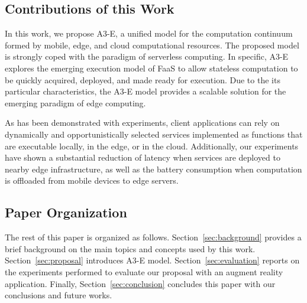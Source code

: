 \subsection{Contributions of this Work}

In this work, we propose A3-E, a unified model for the computation continuum formed by mobile, edge, and cloud computational resources. The proposed model is strongly coped with the paradigm of serverless computing. In specific, A3-E explores the emerging execution model of FaaS to allow stateless computation to be quickly acquired, deployed, and made ready for execution. Due to the its particular characteristics, the A3-E model provides a scalable solution for the emerging paradigm of edge computing. 

As has been demonstrated with experiments, client applications can rely on dynamically and opportunistically selected services implemented as functions that are executable locally, in the edge, or in the cloud. Additionally, our experiments have shown a substantial reduction of latency when services are deployed to nearby edge infrastructure, as well as the battery consumption when computation is offloaded from mobile devices to edge servers.


\subsection{Paper Organization}

The rest of this paper is organized as follows. Section~\ref{sec:background} provides a brief background on the main topics and concepts used by this work. Section~\ref{sec:proposal} introduces A3-E model. Section~\ref{sec:evaluation} reports on the experiments performed to evaluate our proposal with an augment reality application. Finally, Section~\ref{sec:conclusion} concludes this paper with our conclusions and future works.




